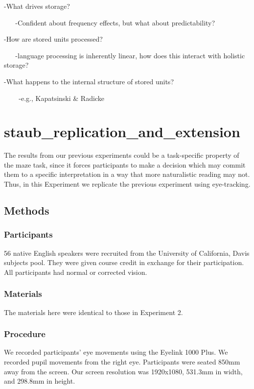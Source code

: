 \documentclass[
  letterpaper,
  DIV=11,
  numbers=noendperiod,
  nottoc,
  oneside]{scrreprt}
\begin{document}
-What drives storage?

~ ~ -Confident about frequency effects, but what about predictability?

-How are stored units processed?

~ ~ -language processing is inherently linear, how does this interact
with holistic storage?

-What happens to the internal structure of stored units?

~ ~ ~-e.g., Kapatsinski \& Radicke


\chapter{staub\_replication\_and\_extension}\label{staub_replication_and_extension}

The results from our previous experiments could be a task-specific
property of the maze task, since it forces participants to make a
decision which may commit them to a specific interpretation in a way
that more naturalistic reading may not. Thus, in this Experiment we
replicate the previous experiment using eye-tracking.

\section{Methods}\label{methods}

\subsection{Participants}\label{participants}

56 native English speakers were recruited from the University of
California, Davis subjects pool. They were given course credit in
exchange for their participation. All participants had normal or
corrected vision.

\subsection{Materials}\label{materials}

The materials here were identical to those in Experiment 2.

\subsection{Procedure}\label{procedure}

We recorded participants' eye movements using the Eyelink 1000 Plus. We
recorded pupil movements from the right eye. Participants were seated
850mm away from the screen. Our screen resolution was 1920x1080, 531.3mm
in width, and 298.8mm in height.
\end{document}

